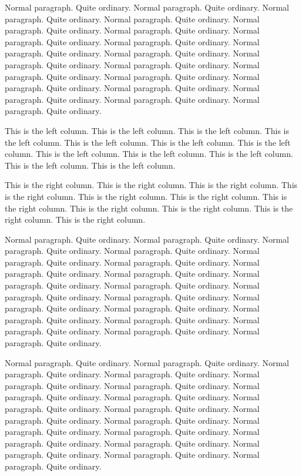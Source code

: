 \documentclass{book}
\begin{document}
\beginnumbering

\pstart
Normal paragraph. Quite ordinary.
Normal paragraph. Quite ordinary.
Normal paragraph. Quite ordinary.
Normal paragraph. Quite ordinary.
Normal paragraph. Quite ordinary.
Normal paragraph. Quite ordinary.
Normal paragraph. Quite ordinary.
Normal paragraph. Quite ordinary.
Normal paragraph. Quite ordinary.
Normal paragraph. Quite ordinary.
Normal paragraph. Quite ordinary.
Normal paragraph. Quite ordinary.
Normal paragraph. Quite ordinary.
Normal paragraph. Quite ordinary.
Normal paragraph. Quite ordinary.
Normal paragraph. Quite ordinary.
Normal paragraph. Quite ordinary.
Normal paragraph. Quite ordinary.
Normal paragraph. Quite ordinary.
\pend

\pausenumbering
\begin{pairs}
\begin{Leftside}
\resumenumbering
\pstart
This is the left column.
This is the left column.
This is the left column.
This is the left column.
This is the left column.
This is the left column.
This is the left column.
This is the left column.
This is the left column.
This is the left column.
This is the left column.
This is the left column.
\pend
\pausenumbering
\end{Leftside}
\begin{Rightside}
\beginnumbering
\pstart
This is the right column.
This is the right column.
This is the right column.
This is the right column.
This is the right column.
This is the right column.
This is the right column.
This is the right column.
This is the right column.
This is the right column.
This is the right column.
\pend
\pausenumbering
\end{Rightside}
\end{pairs}
\Columns

\resumenumbering

\pstart
Normal paragraph. Quite ordinary.
Normal paragraph. Quite ordinary.
Normal paragraph. Quite ordinary.
Normal paragraph. Quite ordinary.
Normal paragraph. Quite ordinary.
Normal paragraph. Quite ordinary.
Normal paragraph. Quite ordinary.
Normal paragraph. Quite ordinary.
Normal paragraph. Quite ordinary.
Normal paragraph. Quite ordinary.
Normal paragraph. Quite ordinary.
Normal paragraph. Quite ordinary.
Normal paragraph. Quite ordinary.
Normal paragraph. Quite ordinary.
Normal paragraph. Quite ordinary.
Normal paragraph. Quite ordinary.
Normal paragraph. Quite ordinary.
Normal paragraph. Quite ordinary.
Normal paragraph. Quite ordinary.
\pend

\pstart
Normal paragraph. Quite ordinary.
Normal paragraph. Quite ordinary.
Normal paragraph. Quite ordinary.
Normal paragraph. Quite ordinary.
Normal paragraph. Quite ordinary.
Normal paragraph. Quite ordinary.
Normal paragraph. Quite ordinary.
Normal paragraph. Quite ordinary.
Normal paragraph. Quite ordinary.
Normal paragraph. Quite ordinary.
Normal paragraph. Quite ordinary.
Normal paragraph. Quite ordinary.
Normal paragraph. Quite ordinary.
Normal paragraph. Quite ordinary.
Normal paragraph. Quite ordinary.
Normal paragraph. Quite ordinary.
Normal paragraph. Quite ordinary.
Normal paragraph. Quite ordinary.
Normal paragraph. Quite ordinary.
\pend
\end{document}
